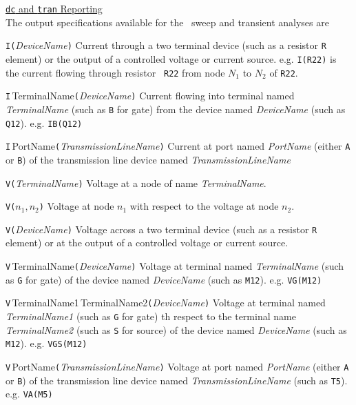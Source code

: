 
\underline{{\tt dc} and {\tt tran} Reporting}\\
The output specifications available for the \dc\ sweep and
transient analyses are

\begin{widelist}

\item[{\tt I(}{\it DeviceName}{\tt )}]
Current through a two terminal device (such as a resistor {\tt R}
element) or the output of a controlled voltage or current source.
e.g. {\tt I(R22)} is the current flowing through resistor {\tt
R22} from node $N_1$ to $N_2$ of {\tt R22}.

\item[{\tt I}{$\,$TerminalName}{\tt (}{\it DeviceName}{\tt )}]
Current flowing into terminal named {\it TerminalName} (such as
{\tt B} for gate) from the device named {\it DeviceName} (such as
{\tt Q12}). e.g. {\tt IB(Q12)}

\item[{\tt I}{$\,$PortName}{\tt (}{\it TransmissionLineName}{\tt )}]
Current at port named {\it PortName} (either {\tt A} or {\tt B})
of the transmission line device named   {\it TransmissionLineName}

\item[{\tt V(}{\it TerminalName}{\tt )}]
Voltage at a node of name {\it TerminalName}.

\item[{\tt V(}{$n_1,n_2$}{\tt )}]
Voltage at node $n_1$ with respect to the voltage
 at node $n_2$.

\item[{\tt V(}{\it DeviceName}{\tt )}]
Voltage across a two terminal device (such as a resistor {\tt R}
element) or at the output of a controlled voltage or current
source.

\item[{\tt V}{$\,$TerminalName}{\tt (}{\it DeviceName}{\tt )}]
Voltage at terminal named {\it TerminalName} (such as {\tt G} for
gate) of the device named   {\it DeviceName} (such as {\tt M12}).
e.g. {\tt VG(M12)}

\item[{\tt V}{$\,$TerminalName1$\,$TerminalName2}{\tt (}{\it DeviceName}{\tt )}]
Voltage at terminal named {\it TerminalName1} (such as {\tt G} for
gate) th respect to the terminal name {\it TerminalName2} (such as
{\tt S} for source) of the device named   {\it DeviceName} (such
as {\tt M12}). e.g. {\tt VGS(M12)}

\item[{\tt V}{$\,$PortName}{\tt (}{\it TransmissionLineName}{\tt )}]
Voltage at port named {\it PortName} (either {\tt A} or {\tt B})
of the transmission line device named   {\it TransmissionLineName}
(such as {\tt T5}). e.g. {\tt VA(M5)}

\end{widelist}

